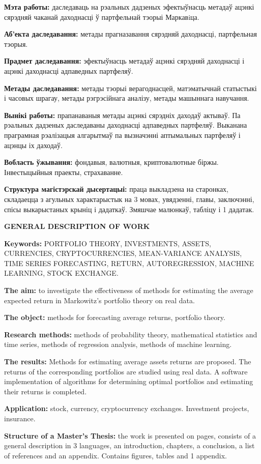 \textbf{Мэта работы:} 
даследаваць на рэальных дадзеных эфектыўнасць метадаў ацэнкі сярэдняй чаканай даходнасці ў партфельнай тэорыі Маркавiца.

\textbf{Аб’екта даследавання:} 
метады прагназавання сярэдняй даходнасці, партфельная тэорыя.

\textbf{Прадмет даследавання:}
эфектыўнасць метадаў ацэнкі сярэдняй даходнасці і ацэнкі даходнасці адпаведных партфеляў.

\textbf{Метады даследавання:}
метады тэорыі верагоднасцей, матэматычнай статыстыкі і часовых шрагау, метады рэгрэсійнага аналізу, метады машыннага навучання.

\textbf{Вынікі работы:}
прапанаваныя метады ацэнкі сярэдніх даходаў актываў. Па рэальных дадзеных даследаваны даходнасці адпаведных партфеляў.
Выканана праграмная рэалізацыя алгарытмаў па вызначэнні аптымальных партфеляў і ацэнцы іх даходаў.

\textbf{Вобласть ўжывання:}
фондавыя, валютныя, криптовалютные біржы. Інвестыцыйныя праекты, страхаванне.

\textbf{Структура магістэрскай дысертацыі:}
праца выкладзена на \pageref{LastPage} старонках, складаецца з агульных характарыстык на 3 мовах, увядзенні,
\totalchapters{} главы, заключэнні, спісы выкарыстаных крыніц і дадаткаў.
Змяшчае \totalfigures{} малюнкаў, \totaltables{} табліцу і 1 дадатак.

\newpage
{}
\begin{center}
	\textbf{\large GENERAL DESCRIPTION OF WORK}
\end{center}

\textbf{Keywords:}
PORTFOLIO THEORY, INVESTMENTS, ASSETS, CURRENCIES, CRYPTOCURRENCIES, MEAN-VARIANCE ANALYSIS, 
TIME SERIES FORECASTING, RETURN, AUTOREGRESSION, MACHINE LEARNING, STOCK EXCHANGE.

\textbf{The aim:}
to investigate the effectiveness of methods for estimating the average expected return in Markowitz's portfolio theory on real data.

\textbf{The object:}
methods for forecasting average returns, portfolio theory.

\textbf{Research methods:} 
methods of probability theory, mathematical statistics and time series, methods of regression analysis, methods of machine learning.

\textbf{The results:}
Methods for estimating average assets returns are proposed. 
The returns of the corresponding portfolios are studied using real data. 
A software implementation of algorithms for determining optimal portfolios and estimating their returns is completed.

\textbf{Application:}
stock, currency, cryptocurrency exchanges. Investment projects, insurance.

\textbf{Structure of a Master's Thesis:}
the work is presented on \pageref{LastPage} pages, consists of a general description in 3 languages, an introduction,
\totalchapters{} chapters, a conclusion, a list of references and an appendix.
Contains \totalfigures{} figures, \totaltables{} tables and 1 appendix.